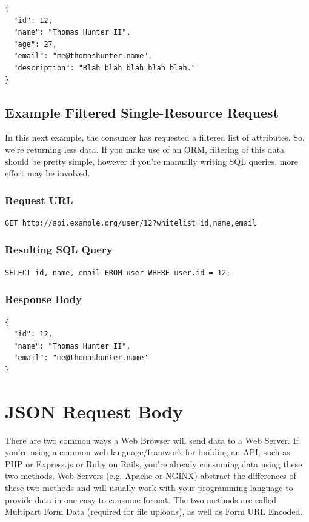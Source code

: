 \documentclass{book}
\begin{document}
\begin{verbatim}
{
  "id": 12,
  "name": "Thomas Hunter II",
  "age": 27,
  "email": "me@thomashunter.name",
  "description": "Blah blah blah blah blah."
}
\end{verbatim}

\subsection{Example Filtered Single-Resource Request}

In this next example, the consumer has requested a filtered list of attributes. So, we're returning less data. If you make use of an ORM, filtering of this data should be pretty simple, however if you're manually writing SQL queries, more effort may be involved.

\subsubsection{Request URL}

\begin{verbatim}
GET http://api.example.org/user/12?whitelist=id,name,email
\end{verbatim}

\subsubsection{Resulting SQL Query}

\begin{verbatim}
SELECT id, name, email FROM user WHERE user.id = 12;
\end{verbatim}

\subsubsection{Response Body}

\begin{verbatim}
{
  "id": 12,
  "name": "Thomas Hunter II",
  "email": "me@thomashunter.name"
}
\end{verbatim}


\section{JSON Request Body}

There are two common ways a Web Browser will send data to a Web Server. If you're using a common web language/framwork for building an API, such as PHP or Express.js or Ruby on Rails, you're already consuming data using these two methods. Web Servers (e.g. Apache or NGINX) abstract the differences of these two methods and will usually work with your programming language to provide data in one easy to consume format. The two methods are called Multipart Form Data (required for file uploads), as well as Form URL Encoded.
\end{document}
